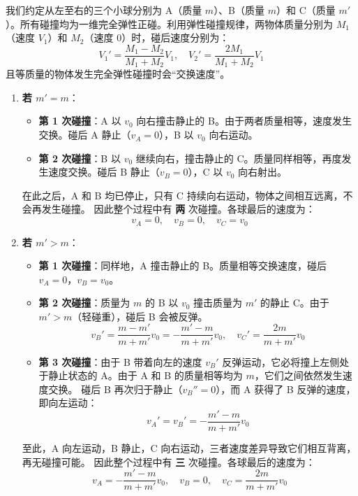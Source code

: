 \begin{solution}
我们约定从左至右的三个小球分别为 A（质量 $m$）、B（质量 $m$）和 C（质量 $m'$）。所有碰撞均为一维完全弹性正碰。利用弹性碰撞规律，两物体质量分别为 $M_1$（速度 $V_1$）和 $M_2$（速度 $0$）时，碰后速度分别为：
$$ V_1' = \frac{M_1 - M_2}{M_1 + M_2} V_1, \quad V_2' = \frac{2M_1}{M_1 + M_2} V_1 $$
且等质量的物体发生完全弹性碰撞时会“交换速度”。

\begin{enumerate}
    \item[(a)] \textbf{若 $m' = m$}：
    \begin{itemize}
        \item \textbf{第 1 次碰撞}：A 以 $v_0$ 向右撞击静止的 B。由于两者质量相等，速度发生交换。碰后 A 静止（$v_A = 0$），B 以 $v_0$ 向右运动。
        \item \textbf{第 2 次碰撞}：B 以 $v_0$ 继续向右，撞击静止的 C。质量同样相等，再度发生速度交换。碰后 B 静止（$v_B = 0$），C 以 $v_0$ 向右射出。
    \end{itemize}
    在此之后，A 和 B 均已停止，只有 C 持续向右运动，物体之间相互远离，不会再发生碰撞。
    因此整个过程中有 \textbf{两} 次碰撞。各球最后的速度为：
    $$ v_A = 0, \quad v_B = 0, \quad v_C = v_0 $$

    \item[(b)] \textbf{若 $m' > m$}：
    \begin{itemize}
        \item \textbf{第 1 次碰撞}：同样地，A 撞击静止的 B。质量相等交换速度，碰后 $v_A = 0$，$v_B = v_0$。
        \item \textbf{第 2 次碰撞}：质量为 $m$ 的 B 以 $v_0$ 撞击质量为 $m'$ 的静止 C。由于 $m' > m$（轻碰重），碰后 B 会被反弹。
        $$ v_B' = \frac{m - m'}{m + m'} v_0 = -\frac{m' - m}{m + m'} v_0, \quad v_C' = \frac{2m}{m + m'} v_0 $$
        \item \textbf{第 3 次碰撞}：由于 B 带着向左的速度 $v_B'$ 反弹运动，它必将撞上左侧处于静止状态的 A。由于 A 和 B 的质量相等均为 $m$，它们之间依然发生速度交换。
        碰后 B 再次归于静止（$v_B'' = 0$），而 A 获得了 B 反弹的速度，即向左运动：
        $$ v_A' = v_B' = -\frac{m' - m}{m + m'} v_0 $$
    \end{itemize}
    至此，A 向左运动，B 静止，C 向右运动，三者速度差异导致它们相互背离，再无碰撞可能。
    因此整个过程中有 \textbf{三} 次碰撞。各球最后的速度为：
    $$ v_A = -\frac{m' - m}{m + m'} v_0, \quad v_B = 0, \quad v_C = \frac{2m}{m + m'} v_0 $$
\end{enumerate}
\end{solution}

